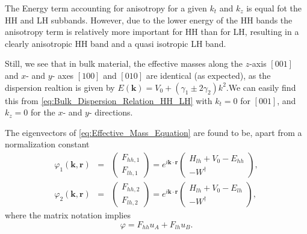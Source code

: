 The Energy term accounting for anisotropy for a given $k_{t}$ and
$k_{z}$ is equal fot the HH and LH subbands. However, due to the
lower energy of the HH bands the anisotropy term is relatively more
important for HH than for LH, resulting in a clearly anisotropic HH
band and a quasi isotropic LH band.

Still, we see that in bulk material, the effective masses along the
$z$-axis $\left[001\right]$ and $x$- and $y$- axes $\left[100\right]$
and $\left[010\right]$ are identical (as expected), as the dispersion
realtion is given by $E(\mathbf{k})=V_{0}+\left(\gamma_{1}\pm2\gamma_{2}\right)k^{2}.$We
can easily find this from \ref{eq:Bulk_Dispersion_Relation_HH_LH}
with $k_{t}=0$ for $\left[001\right]$, and $k_{z}=0$ for the $x$-
and $y$- directions.

The eigenvectors of \ref{eq:Effective_Mass_Equation} are found to
be, apart from a normalization constant \begin{eqnarray}
\varphi_{1}(\mathbf{k},\mathbf{r}) & = & \left(\begin{array}{c}
F_{hh,1}\\
F_{lh,1}\end{array}\right)=e^{i\mathbf{k}\cdot\mathbf{r}}\left(\begin{array}{c}
H_{lh}+V_{0}-E_{hh}\\
-W^{\dagger}\end{array}\right),\label{eq:Phi_1}\\
\varphi_{2}(\mathbf{k},\mathbf{r}) & = & \left(\begin{array}{c}
F_{hh,2}\\
F_{lh,2}\end{array}\right)=e^{i\mathbf{k}\cdot\mathbf{r}}\left(\begin{array}{c}
H_{lh}+V_{0}-E_{lh}\\
-W^{\dagger}\end{array}\right),\label{eq:Phi_2}\end{eqnarray}
where the matrix notation implies\begin{equation}
\varphi=F_{hh}u_{A}+F_{lh}u_{B}.\end{equation}


